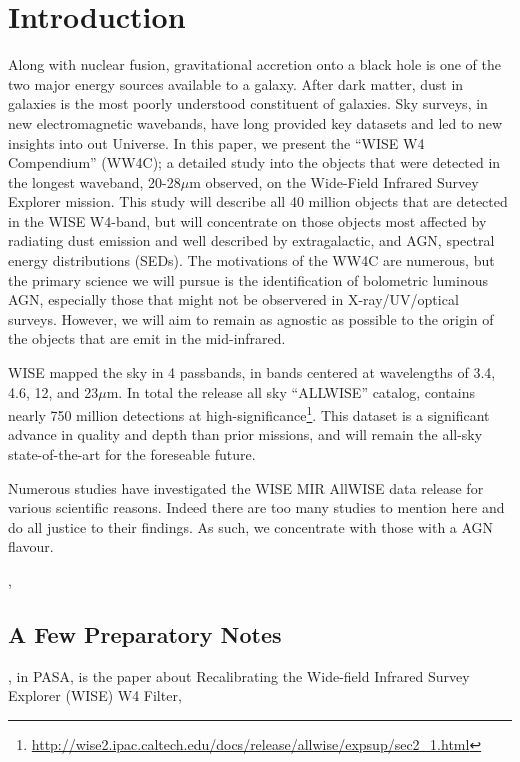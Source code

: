 \documentclass[usenatbib]{mn2e}
\begin{document}
\section{Introduction}
Along with nuclear fusion, gravitational accretion onto a black hole is one of the two major energy sources available to a galaxy. 
After dark matter, dust in galaxies is the most poorly understood constituent of galaxies. 
Sky surveys, in new electromagnetic wavebands, have long provided key datasets and led to new insights into out Universe. 
In this paper, we present the ``WISE W4 Compendium'' (WW4C); a detailed study into the objects that were detected in the
longest waveband, 20-28$\mu$m observed, on the Wide-Field Infrared Survey Explorer \citep[WISE;][]{Wright10, Cutri13} mission. 
This study will describe all 40 million objects that are detected in the WISE W4-band, but will concentrate on those objects most affected by radiating dust emission and well described by extragalactic, and AGN, spectral energy distributions (SEDs). 
The motivations of the WW4C are numerous, but the primary science we will pursue is the identification of bolometric luminous AGN, especially those that might not be observered in X-ray/UV/optical surveys. 
However, we will aim to remain as agnostic as possible to the origin of the objects that are emit in the mid-infrared. 


WISE mapped the sky in 4 passbands, in bands centered at wavelengths of 3.4, 4.6, 12, and 23$\mu$m. 
In total the release all sky ``ALLWISE'' catalog, contains nearly 750 million detections at high-significance\footnote{
\href{http://wise2.ipac.caltech.edu/docs/release/allwise/expsup/sec2\_1.html}{http://wise2.ipac.caltech.edu/docs/release/allwise/expsup/sec2\_1.html}}. 
This dataset is a significant advance in quality and depth than prior missions, and will remain the all-sky state-of-the-art for the foreseable future. 

Numerous studies have investigated the WISE MIR AllWISE data release for various scientific reasons. 
Indeed there are too many studies to mention here and do all justice to their findings. 
As such, we concentrate with those with a AGN flavour. 

\citet{Assef13}, 
\citet{Stern12}



\subsection{A Few Preparatory Notes}
\citet{Brown14b}, in PASA, is the paper about Recalibrating the Wide-field Infrared Survey Explorer (WISE) W4 Filter,
\end{document}
